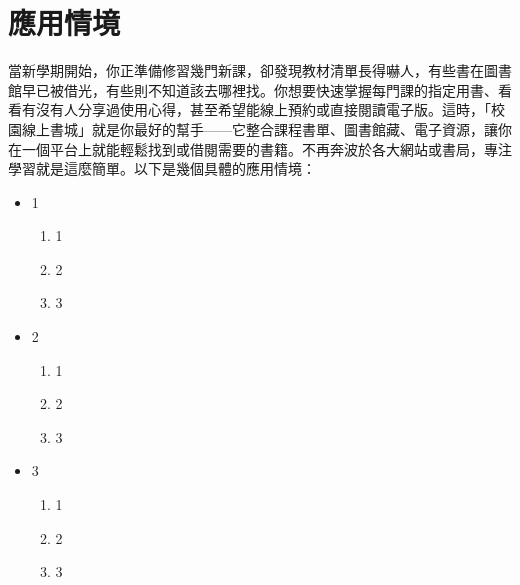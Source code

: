 \chapter{應用情境}

\hspace{2em}當新學期開始，你正準備修習幾門新課，卻發現教材清單長得嚇人，有些書在圖書館早已被借光，有些則不知道該去哪裡找。你想要快速掌握每門課的指定用書、看看有沒有人分享過使用心得，甚至希望能線上預約或直接閱讀電子版。這時，「校園線上書城」就是你最好的幫手——它整合課程書單、圖書館藏、電子資源，讓你在一個平台上就能輕鬆找到或借閱需要的書籍。不再奔波於各大網站或書局，專注學習就是這麼簡單。以下是幾個具體的應用情境：

\begin{itemize}
    \item 1
        \begin{enumerate}
            \item 1
            \item 2
            \item 3
        \end{enumerate}
        
    \item 2
        \begin{enumerate}
            \item 1
            \item 2
            \item 3
        \end{enumerate}
         
    \item 3
        \begin{enumerate}
            \item 1
            \item 2
            \item 3
        \end{enumerate}
    
\end{itemize}